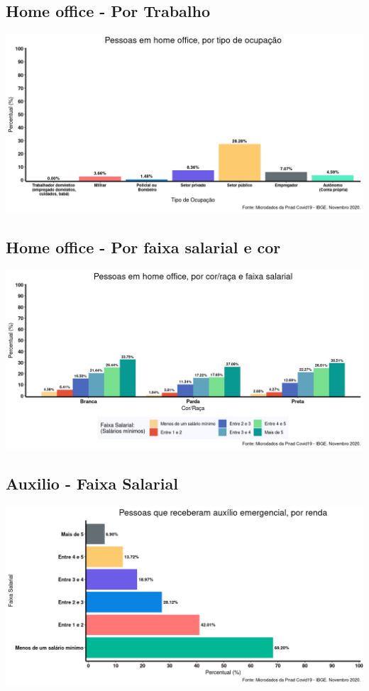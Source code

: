 \documentclass{SelfArx}
\begin{document}
\subsection*{Home office - Por Trabalho}
\label{sec:orgf837123}
\begin{center}
\includegraphics[width=.9\linewidth]{./figs/PNAD_COVID/home_emprego.png}
\end{center}

\subsection*{Home office - Por faixa salarial e cor}
\label{sec:orgd9f4642}
\begin{center}
\includegraphics[width=.9\linewidth]{./figs/PNAD_COVID/home_renda.png}
\end{center}
\subsection*{Auxilio - Faixa Salarial}
\label{sec:org0e01605}
\begin{center}
\includegraphics[width=.9\linewidth]{./figs/PNAD_COVID/auxilio_renda.png}
\end{center}
\end{document}
